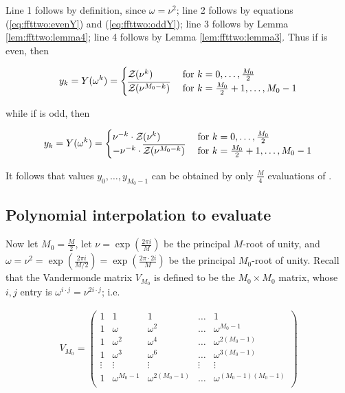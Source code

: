 Line 1 follows by definition, since $\omega=\nu^2$;
line 2 follows by equations (\ref{eq:ffttwo:evenY}) and
(\ref{eq:ffttwo:oddY});
line 3 follows by Lemma \ref{lem:ffttwo:lemma4};
line 4 follows by Lemma \ref{lem:ffttwo:lemma3}.
Thus if \dBP{\strA}{\strB} is even, then

\begin{align}
\label{eq:ffttwo:trickForRoU1}
y_k = Y(\omega^k) =
\begin{cases}
\emZof{}{\nu^k}
& \text{ for } k=0,\dots,\frac{M_0}{2} \\
\overline{\emZof{}{\nu^{M_0-k}}}
& \text{ for } k=\frac{M_0}{2}+1,\dots,M_0-1 \\
\end{cases}
\end{align}

while if \dBP{\strA}{\strB} is odd, then

\begin{align}
\label{eq:ffttwo:trickForRoU2}
y_k = Y(\omega^k) =
\begin{cases}
\nu^{-k} \cdot \emZof{}{\nu^k}
& \text{ for } k=0,\dots,\frac{M_0}{2} \\
-\nu^{-k} \cdot \overline{\emZof{}{\nu^{M_0-k}}}
& \text{ for } k=\frac{M_0}{2}+1,\dots,M_0-1 \\
\end{cases}
\end{align}

It follows that values $y_0,\dots,y_{M_0-1}$ can be obtained by only
$\frac{M}{4}$ evaluations of \emZ{}.

\subsection{Polynomial interpolation to evaluate
\texorpdfstring{}{}}
\label{subsec:ffttwo:fft}

Now let $M_0=\frac{M}{2}$, let
$\nu=\exp(\frac{2\pi i}{M})$ be the principal $M$-root of unity, and
$\omega=\nu^2=\exp(\frac{2\pi i}{M/2})=\exp(\frac{2\pi \cdot 2i}{M})$ be
the principal $M_0$-root of unity. Recall that the
Vandermonde matrix $V_{M_0}$ is defined to be the
$M_0 \times M_0$ matrix, whose $i,j$ entry is
$\omega^{i \cdot j} = \nu^{2 i \cdot j}$;
i.e.

\begin{align}
\label{eq:ffttwo:vandermonde}
V_{M_0} = \left(
\begin{array}{rrrrr}
1 & 1 & 1 & \dots & 1 \\
1 & \omega & \omega^2 & \dots & \omega^{M_0-1} \\
1 & \omega^2 & \omega^4 & \dots & \omega^{2(M_0-1)} \\
1 & \omega^3 & \omega^6 & \dots & \omega^{3(M_0-1)} \\
\vdots & \vdots & \vdots & \vdots & \vdots \\
1 & \omega^{M_0-1} & \omega^{2(M_0-1)} & \dots & \omega^{(M_0-1)(M_0-1)} \\
\end{array}
\right)
\end{align}

